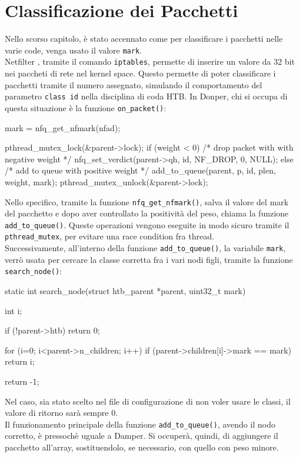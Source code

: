 \section{Classificazione dei Pacchetti}
Nello scorso capitolo, è stato accennato come per classificare i pacchetti nelle varie code, venga usato il valore \texttt{mark}. \\
Netfilter \cite{netfilter}, tramite il comando \texttt{iptables}, permette di inserire un valore da 32 bit nei paccheti di rete nel kernel space.
Questo permette di poter classificare i pacchetti tramite il numero assegnato, simulando il comportamento del parametro \texttt{class id} nella disciplina di coda HTB.
\vspace*{0.01\textheight}
In Donper, chi si occupa di questa situazione è la funzione \texttt{on\_packet()}:

\begin{clang}
  mark = nfq_get_nfmark(nfad);

  pthread_mutex_lock(&parent->lock);
  if (weight < 0) {
    /* drop packet with with negative weight */
    nfq_set_verdict(parent->qh, id, NF_DROP, 0, NULL);
  } else {
    /* add to queue with positive weight */
    add_to_queue(parent, p, id, plen, weight, mark);
  }
  pthread_mutex_unlock(&parent->lock);
\end{clang}
Nello specifico, tramite la funzione \texttt{nfq\_get\_nfmark()}, salva il valore del mark del pacchetto e dopo aver controllato la positività del peso, chiama la funzione \texttt{add\_to\_queue()}.
Queste operazioni vengono eseguite in modo sicuro tramite il \texttt{pthread\_mutex}, per evitare una race condition fra thread. \\
\vspace*{0.01\textheight}
Successivamente, all'interno della funzione \texttt{add\_to\_queue()}, la variabile \texttt{mark}, verrò usata per cercare la classe corretta fra i vari nodi figli, tramite la funzione \texttt{search\_node()}:
\begin{clang}
static int
search_node(struct htb_parent *parent, uint32_t mark)
{
  int i;
  
  if (!parent->htb) {
    return 0;
  }

  for (i=0; i<parent->n_children; i++) {
    if (parent->children[i]->mark == mark)
      return i;
  }

  return -1;
}
\end{clang}
Nel caso, sia stato scelto nel file di configurazione di non voler usare le classi, il valore di ritorno sarà sempre 0.\\ 
\vspace*{0.01\textheight}
Il funzionamento principale della funzione \texttt{add\_to\_queue()}, avendo il nodo corretto, è pressochè uguale a Damper. 
Si occuperà, quindi, di aggiungere il pacchetto all'array, sostituendolo, se necessario, con quello con peso minore.

